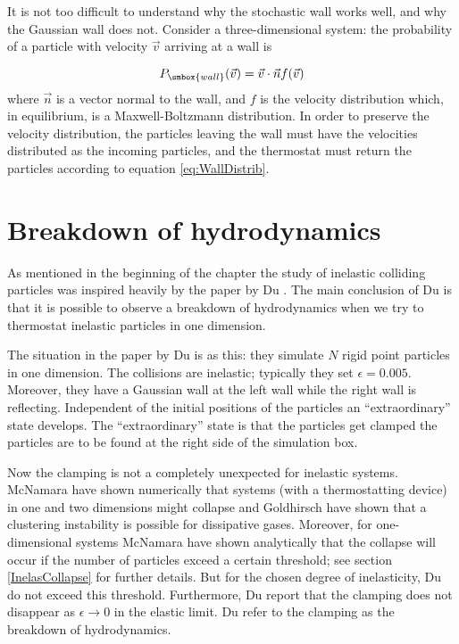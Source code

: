 It is not too difficult to understand why the stochastic wall works
well, and why the Gaussian wall does not. Consider a three-dimensional
system: the probability of a particle with velocity $\vec{v}$ arriving
at a wall is \cite{Guggenheim60}

\begin{equation}
\label{eq:WallDistrib}
  P_{\smbox{wall}}(\vec{v}) = \vec{v}\cdot\vec{n}
     f(\vec{v})
\end{equation}
where $\vec{n}$ is a vector normal to the wall, and $f$ is the velocity
distribution which, in equilibrium, is a Maxwell-Boltzmann
distribution. In order to preserve the velocity distribution, the
particles leaving the wall must have the velocities distributed as the
incoming particles, and the thermostat must return the particles
according to equation \eqref{eq:WallDistrib}.


\section{Breakdown of hydrodynamics}
As mentioned in the beginning of the chapter the study of inelastic
colliding particles was inspired heavily by the paper by Du \etal
\cite{Du95}. The main conclusion of Du \etal is that it is possible to
observe a breakdown of hydrodynamics when we try to thermostat
inelastic particles in one dimension. 

The situation in the paper by Du \etal \cite{Du95} is as this: they
simulate $N$ rigid point particles in one dimension. The collisions
are inelastic; typically they set $\epsilon = 0.005$. Moreover, they
have a Gaussian wall at the left wall while the right wall is
reflecting. Independent of the initial positions of the particles an
``extraordinary'' state develops. The ``extraordinary'' state is that
the particles get clamped \ie the particles are to be found at the right
side of the simulation box.

Now the clamping is not a completely unexpected for inelastic
systems. McNamara \etal \cite{McNamara93a, McNamara94a} have
shown numerically that systems (with a thermostatting device) in one
and two dimensions might collapse and Goldhirsch \etal \cite{Goldhirsch93}
have shown that a
clustering instability is possible for dissipative gases. Moreover,
for one-dimensional systems McNamara \etal have shown analytically
that the collapse will occur if
the number of particles exceed a certain threshold; see section
\ref{InelasCollapse} for further details. But for the chosen degree of
inelasticity, Du \etal do not exceed this threshold. Furthermore, Du
\etal report that the clamping does not disappear as $\epsilon
\rightarrow 0$ \ie in the elastic limit. Du \etal refer to the
clamping as the breakdown of hydrodynamics.

